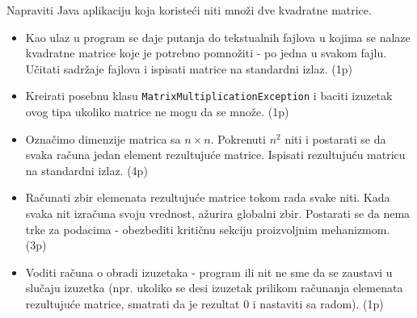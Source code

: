 \documentclass[]{article}
\begin{document}
\begin{enumerate}
  Napraviti Java aplikaciju koja koriste\'c{}i niti mno\v{z}i dve kvadratne matrice.
  \begin{itemize}
    \item Kao ulaz u program se daje putanja do tekstualnih fajlova u kojima se nalaze kvadratne matrice koje je potrebno pomno\v{z}iti - po jedna u svakom fajlu. U\v{c}itati sadr\v{z}aje fajlova i ispisati matrice na standardni izlaz. \hfill (1p)
    \item Kreirati posebnu klasu \texttt{MatrixMultiplicationException} i baciti izuzetak ovog tipa ukoliko matrice ne mogu da se mno\v{z}e. \hfill (1p)
    \item Ozna\v{c}imo dimenzije matrica sa $n \times n$. Pokrenuti $n^2$ niti i postarati se da svaka ra\v{c}una jedan element rezultuju\'c{}e matrice. Ispisati rezultuju\'c{}u matricu na standardni izlaz. \hfill (4p)
    \item Ra\v{c}unati zbir elemenata rezultuju\'c{}e matrice tokom rada svake niti. Kada svaka nit izra\v{c}una svoju vrednost, a\v{z}urira globalni zbir. Postarati se da nema trke za podacima - obezbediti kriti\v{c}nu sekciju proizvoljnim mehanizmom. \hfill (3p)
    \item Voditi ra\v{c}una o obradi izuzetaka - program ili nit ne sme da se zaustavi u slu\v{c}aju izuzetka (npr. ukoliko se desi izuzetak prilikom ra\v{c}unanja elemenata rezultuju\'c{}e matrice, smatrati da je rezultat $0$ i nastaviti sa radom). \hfill (1p)
  \end{itemize}


\end{enumerate}
\end{document}

